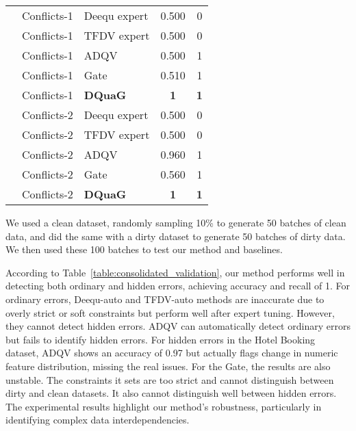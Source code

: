 \begin{table}[tb]
\begin{tabular}{lllcc}
 \cline{2-5}
 & Conflicts-1 & Deequ expert & 0.500 & 0 \\
& Conflicts-1 & TFDV expert & 0.500 & 0 \\
& Conflicts-1 & ADQV & 0.500 & 1 \\
& Conflicts-1 & Gate & 0.510 & 1 \\
 & Conflicts-1 & \textbf{DQuaG} & \textbf{1} & \textbf{1}\\
  \cline{2-5}
 & Conflicts-2 & Deequ expert & 0.500 & 0 \\
 & Conflicts-2 & TFDV expert & 0.500 & 0 \\
 & Conflicts-2 & ADQV & 0.960 & 1 \\
 & Conflicts-2 & Gate & 0.560 & 1 \\
 & Conflicts-2 & \textbf{DQuaG} & \textbf{1} & \textbf{1} \\ 
\hline
\end{tabular}%

\end{table}





We used a clean dataset, randomly sampling 10\% to generate 50 batches of clean data, and did the same with a dirty dataset to generate 50 batches of dirty data. We then used these 100 batches to test
our method and baselines.

According to Table~\ref{table:consolidated_validation}, our method performs well in detecting both ordinary and hidden errors, achieving accuracy and recall of 1. 
For ordinary errors, Deequ-auto and TFDV-auto methods are inaccurate due to overly strict or soft constraints but perform well after expert tuning. However, they cannot detect hidden errors. 
ADQV can automatically detect ordinary errors but fails to identify hidden errors. 
For hidden errors in the Hotel Booking dataset, ADQV shows an accuracy of 0.97 but actually flags change in numeric feature distribution, missing the real issues. 
For the Gate, the results are also unstable. The constraints it sets are too strict and cannot distinguish between dirty and clean datasets. It also cannot distinguish well between hidden errors.
The experimental results highlight our method's robustness, particularly in identifying complex data interdependencies.






